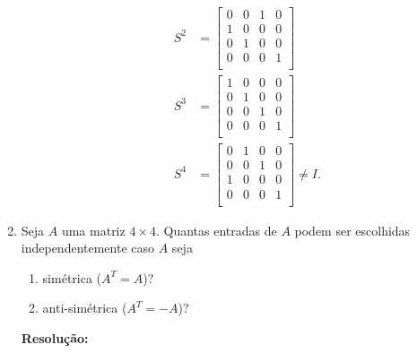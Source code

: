 \documentclass[leqno]{article}
\begin{document}
\begin{enumerate}
\begin{enumerate}
        \begin{align*}
            S^2&=\begin{bmatrix}
            0 & 0 & 1 & 0\\
            1 & 0 & 0 & 0\\
            0 & 1 & 0 & 0\\
            0 & 0 & 0 & 1\\
            \end{bmatrix}\\
            S^3&=\begin{bmatrix}
            1 & 0 & 0 & 0\\
            0 & 1 & 0 & 0\\
            0 & 0 & 1 & 0\\
            0 & 0 & 0 & 1\\
            \end{bmatrix}\\
            S^4&=\begin{bmatrix}
            0 & 1 & 0 & 0\\
            0 & 0 & 1 & 0\\
            1 & 0 & 0 & 0\\
            0 & 0 & 0 & 1\\
            \end{bmatrix}\neq I\text{.}
        \end{align*}
    \end{enumerate}
    
    \item Seja $A$ uma matriz $4\times4$. Quantas entradas de $A$ podem ser escolhidas independentemente caso $A$ seja
    
    \begin{enumerate}
        \item simétrica ($A^T=A$)?
        \item anti-simétrica ($A^T=-A$)?
    \end{enumerate}
    
    \textbf{Resolução:}
    

\end{enumerate}
\end{document}
